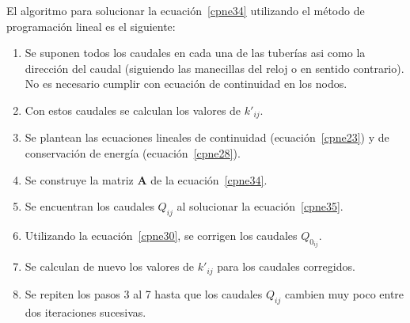 \documentclass[11pt, oneside]{article}
\begin{document}
El algoritmo para solucionar la ecuaci\'on~\ref{cpne34} utilizando el m\'etodo de programaci\'on lineal es el siguiente:

\begin{enumerate}
\item Se suponen todos los caudales en cada una de las tuber\'ias asi como la direcci\'on del caudal (siguiendo las manecillas del reloj o en sentido contrario). No es necesario cumplir con ecuaci\'on de continuidad en los nodos.
\item Con estos caudales se calculan los valores de $k'_{ij}$.
\item Se plantean las ecuaciones lineales de continuidad (ecuaci\'on~\ref{cpne23}) y de conservaci\'on de energ\'ia (ecuaci\'on~\ref{cpne28}).
\item Se construye la matriz $\mathbf{A}$ de la ecuaci\'on~\ref{cpne34}.
\item Se encuentran los caudales $Q_{ij}$ al solucionar la ecuaci\'on~\ref{cpne35}.
\item Utilizando la ecuaci\'on~\ref{cpne30}, se corrigen los caudales $Q_{0_{ij}}$.
\item Se calculan de nuevo los valores de $k'_{ij}$ para los caudales corregidos.
\item Se repiten los pasos 3 al 7 hasta que los caudales $Q_{ij}$ cambien muy poco entre dos iteraciones sucesivas. 
\end{enumerate}



\end{document}
